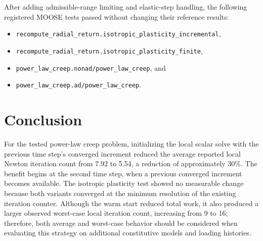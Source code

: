 \documentclass[11pt]{article}
\begin{document}
After adding admissible-range limiting and elastic-step handling, the following registered MOOSE tests passed without changing their reference results:
\begin{itemize}
  \item \texttt{recompute\_radial\_return.isotropic\_plasticity\_incremental},
  \item \texttt{recompute\_radial\_return.isotropic\_plasticity\_finite},
  \item \texttt{power\_law\_creep.nonad/power\_law\_creep}, and
  \item \texttt{power\_law\_creep.ad/power\_law\_creep}.
\end{itemize}

\section{Conclusion}

For the tested power-law creep problem, initializing the local scalar solve with the previous time step's converged increment reduced the average reported local Newton iteration count from 7.92 to 5.54, a reduction of approximately 30\%.  The benefit begins at the second time step, when a previous converged increment becomes available.  The isotropic plasticity test showed no measurable change because both variants converged at the minimum resolution of the existing iteration counter.  Although the warm start reduced total work, it also produced a larger observed worst-case local iteration count, increasing from 9 to 16; therefore, both average and worst-case behavior should be considered when evaluating this strategy on additional constitutive models and loading histories.
\end{document}
